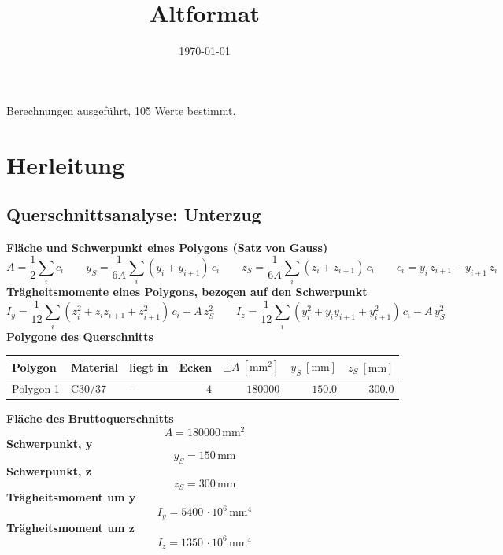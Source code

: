 \documentclass[11pt,a4paper]{article}
\title{Altformat}
\author{}
\date{\today}
\begin{document}
 Berechnungen ausgeführt, 105 Werte bestimmt.

\section{Herleitung}
\subsection{Querschnittsanalyse: Unterzug}
\noindent\textbf{Fläche und Schwerpunkt eines Polygons (Satz von Gauss)}
\begin{equation*}
A = \frac{1}{2} \sum_i c_i \qquad y_S = \frac{1}{6A} \sum_i (y_i + y_{i+1})\, c_i \qquad z_S = \frac{1}{6A} \sum_i (z_i + z_{i+1})\, c_i \qquad c_i = y_i\, z_{i+1} - y_{i+1}\, z_i
\end{equation*}
\noindent\textbf{Trägheitsmomente eines Polygons, bezogen auf den Schwerpunkt}
\begin{equation*}
I_y = \frac{1}{12} \sum_i (z_i^2 + z_i z_{i+1} + z_{i+1}^2)\, c_i - A\, z_S^2\qquad I_z = \frac{1}{12} \sum_i (y_i^2 + y_i y_{i+1} + y_{i+1}^2)\, c_i - A\, y_S^2
\end{equation*}
\noindent\textbf{Polygone des Querschnitts}
\begin{longtable}{lllrrrr}
\hline
Polygon & Material & liegt in & Ecken & $\pm A\ [\mathrm{mm}^2]$ & $y_S\ [\mathrm{mm}]$ & $z_S\ [\mathrm{mm}]$ \\
\hline
\endhead
Polygon 1 & C30/37 & – & $4$ & $180000$ & $150.0$ & $300.0$ \\
\hline
\end{longtable}
\noindent\textbf{Fläche des Bruttoquerschnitts}
\begin{equation*}
A = 180000\,\mathrm{mm}^{2}
\end{equation*}
\noindent\textbf{Schwerpunkt, y}
\begin{equation*}
y_S = 150\,\mathrm{mm}
\end{equation*}
\noindent\textbf{Schwerpunkt, z}
\begin{equation*}
z_S = 300\,\mathrm{mm}
\end{equation*}
\noindent\textbf{Trägheitsmoment um y}
\begin{equation*}
I_y = 5400\,\cdot 10^{6}\,\mathrm{mm}^{4}
\end{equation*}
\noindent\textbf{Trägheitsmoment um z}
\begin{equation*}
I_z = 1350\,\cdot 10^{6}\,\mathrm{mm}^{4}
\end{equation*}
\end{document}
